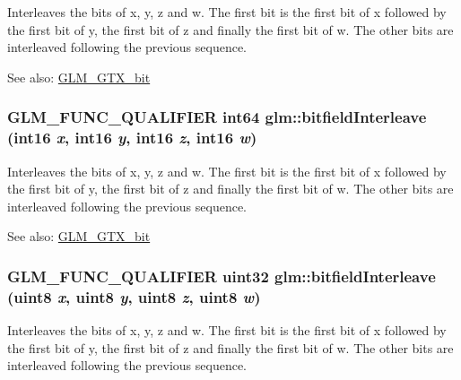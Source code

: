 Interleaves the bits of x, y, z and w. The first bit is the first bit of x followed by the first bit of y, the first bit of z and finally the first bit of w. The other bits are interleaved following the previous sequence.

\begin{Desc}
\item[See also:]\hyperlink{group__gtx__bit}{GLM\_\-GTX\_\-bit} \end{Desc}
\hypertarget{group__gtx__bit_g09ee0be0fac790a1607a711e597dd9bf}{
\subsubsection[bitfieldInterleave]{\setlength{\rightskip}{0pt plus 5cm}GLM\_\-FUNC\_\-QUALIFIER int64 glm::bitfieldInterleave (int16 {\em x}, \/  int16 {\em y}, \/  int16 {\em z}, \/  int16 {\em w})}}
\label{group__gtx__bit_g09ee0be0fac790a1607a711e597dd9bf}


Interleaves the bits of x, y, z and w. The first bit is the first bit of x followed by the first bit of y, the first bit of z and finally the first bit of w. The other bits are interleaved following the previous sequence.

\begin{Desc}
\item[See also:]\hyperlink{group__gtx__bit}{GLM\_\-GTX\_\-bit} \end{Desc}
\hypertarget{group__gtx__bit_g447c0bbed9d60c14578626d8f03f3755}{
\subsubsection[bitfieldInterleave]{\setlength{\rightskip}{0pt plus 5cm}GLM\_\-FUNC\_\-QUALIFIER uint32 glm::bitfieldInterleave (uint8 {\em x}, \/  uint8 {\em y}, \/  uint8 {\em z}, \/  uint8 {\em w})}}
\label{group__gtx__bit_g447c0bbed9d60c14578626d8f03f3755}


Interleaves the bits of x, y, z and w. The first bit is the first bit of x followed by the first bit of y, the first bit of z and finally the first bit of w. The other bits are interleaved following the previous sequence.

